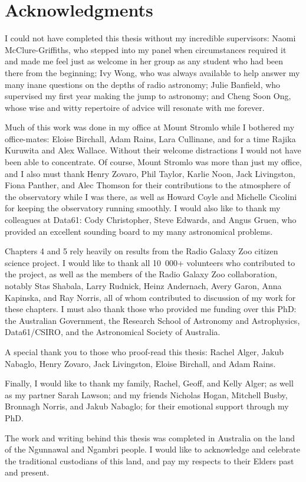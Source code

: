 \chapter*{Acknowledgments}

I could not have completed this thesis without my incredible supervisors: Naomi McClure-Griffiths, who stepped into my panel when circumstances required it and made me feel just as welcome in her group as any student who had been there from the beginning; Ivy Wong, who was always available to help answer my many inane questions on the depths of radio astronomy; Julie Banfield, who supervised my first year making the jump to astronomy; and Cheng Soon Ong, whose wise and witty repertoire of advice will resonate with me forever.

Much of this work was done in my office at Mount Stromlo while I bothered my office-mates: Eloise Birchall, Adam Rains, Lara Cullinane, and for a time Rajika Kuruwita and Alex Wallace. Without their welcome distractions I would not have been able to concentrate. Of course, Mount Stromlo was more than just my office, and I also must thank Henry Zovaro, Phil Taylor, Karlie Noon, Jack Livingston, Fiona Panther, and Alec Thomson for their contributions to the atmosphere of the observatory while I was there, as well as Howard Coyle and Michelle Cicolini for keeping the observatory running smoothly. I would also like to thank my colleagues at Data61: Cody Christopher, Steve Edwards, and Angus Gruen, who provided an excellent sounding board to my many astronomical problems.

Chapters 4 and 5 rely heavily on results from the Radio Galaxy Zoo citizen science project. I would like to thank all 10~000+ volunteers who contributed to the project, as well as the members of the Radio Galaxy Zoo collaboration, notably Stas Shabala, Larry Rudnick, Heinz Andernach, Avery Garon, Anna Kapinska, and Ray Norris, all of whom contributed to discussion of my work for these chapters. I must also thank those who provided me funding over this PhD: the Australian Government, the Research School of Astronomy and Astrophysics, Data61/CSIRO, and the Astronomical Society of Australia.

A special thank you to those who proof-read this thesis: Rachel Alger, Jakub Nabaglo, Henry Zovaro, Jack Livingston, Eloise Birchall, and Adam Rains.

Finally, I would like to thank my family, Rachel, Geoff, and Kelly Alger; as well as my partner Sarah Lawson; and my friends Nicholas Hogan, Mitchell Busby, Bronnagh Norris, and Jakub Nabaglo; for their emotional support through my PhD.

\clearpage

The work and writing behind this thesis was completed in Australia on the land of the Ngunnawal and Ngambri people. I would like to acknowledge and celebrate the traditional custodians of this land, and pay my respects to their Elders past and present.
